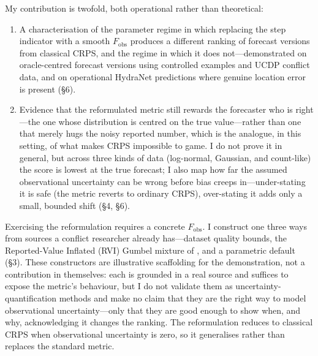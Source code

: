 My contribution is twofold, both operational rather than theoretical:
%
\begin{enumerate}
    \item A characterisation of the parameter regime in which replacing the step indicator with a smooth $F_\text{obs}$ produces a different ranking of forecast versions from classical CRPS, and the regime in which it does not---demonstrated on oracle-centred forecast versions using controlled examples and UCDP conflict data, and on operational HydraNet predictions \citep{VonDerMaase2025hydranet} where genuine location error is present (\S6).

    \item Evidence that the reformulated metric still rewards the forecaster who is right---the one whose distribution is centred on the true value---rather than one that merely hugs the noisy reported number, which is the analogue, in this setting, of what makes CRPS impossible to game. I do not prove it in general, but across three kinds of data (log-normal, Gaussian, and count-like) the score is lowest at the true forecast; I also map how far the assumed observational uncertainty can be wrong before bias creeps in---under-stating it is safe (the metric reverts to ordinary CRPS), over-stating it adds only a small, bounded shift (\S4, \S6).
\end{enumerate}
%
Exercising the reformulation requires a concrete $F_\text{obs}$. I construct one three ways from sources a conflict researcher already has---dataset quality bounds, the Reported-Value Inflated (RVI) Gumbel mixture of \citet{vesco2026uncertainty}, and a parametric default (\S3). These constructors are illustrative scaffolding for the demonstration, not a contribution in themselves: each is grounded in a real source and suffices to expose the metric's behaviour, but I do not validate them as uncertainty-quantification methods and make no claim that they are the right way to model observational uncertainty---only that they are good enough to show when, and why, acknowledging it changes the ranking. The reformulation reduces to classical CRPS when observational uncertainty is zero, so it generalises rather than replaces the standard metric.
